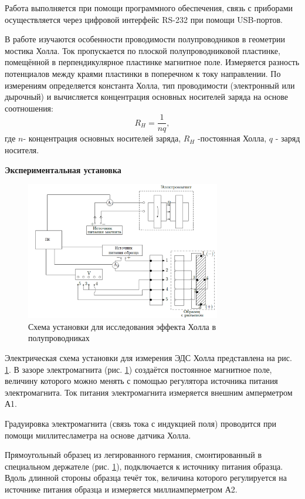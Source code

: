 \documentclass[a4paper,12pt]{article} %
\begin{document}
Работа выполняется при помощи программного обеспечения, связь с приборами осуществляется через цифровой интерфейс RS-232 при помощи USB-портов.

В работе изучаются особенности проводимости полупроводников в
геометрии мостика Холла. Ток пропускается по плоской полупроводниковой пластинке, помещённой в перпендикулярное пластинке магнитное
поле. Измеряется разность потенциалов между краями пластинки в поперечном к току направлении. По измерениям определяется константа
Холла, тип проводимости (электронный или дырочный) и вычисляется концентрация основных носителей заряда на основе соотношения:
\begin{equation}
R_H = \frac{1}{nq},
\end{equation}
где $n$- концентрация основных носителей заряда, $R_H$ -постоянная Холла, $q$ - заряд носителя.

\textbf{Экспериментальная установка}
\begin{figure}[h!]
\begin{center}
\includegraphics[width=0.76\textwidth]{Установка}
\caption{Схема установки для исследования эффекта Холла в полупроводниках} \label{установка}
\end{center}
\end{figure} 

Электрическая схема установки для измерения ЭДС Холла представлена на рис. \ref{установка}. В зазоре электромагнита (рис. \ref{установка}) создаётся постоянное
магнитное поле, величину которого можно менять с помощью регулятора источника питания электромагнита. Ток питания электромагнита измеряется внешним амперметром А1.

Градуировка электромагнита (связь тока с индукцией поля) проводится при помощи миллитесламетра на основе датчика Холла.

Прямоугольный образец из легированного германия, смонтированный в специальном держателе (рис. \ref{установка}), подключается к источнику питания образца. Вдоль длинной стороны образца течёт ток, величина которого регулируется на источнике питания образца и измеряется миллиамперметром А2.
\end{document}
